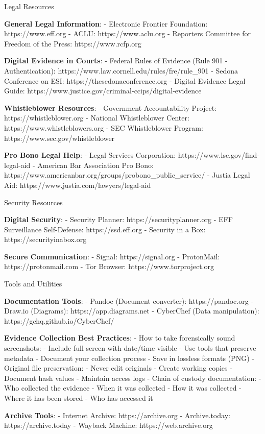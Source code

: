 Legal Resources

\textbf{General Legal Information}: - Electronic Frontier Foundation:
https://www.eff.org - ACLU: https://www.aclu.org - Reporters Committee
for Freedom of the Press: https://www.rcfp.org

\textbf{Digital Evidence in Courts}: - Federal Rules of Evidence (Rule
901 - Authentication): https://www.law.cornell.edu/rules/fre/rule\_901 -
Sedona Conference on ESI: https://thesedonaconference.org - Digital
Evidence Legal Guide:
https://www.justice.gov/criminal-ccips/digital-evidence

\textbf{Whistleblower Resources}: - Government Accountability Project:
https://whistleblower.org - National Whistleblower Center:
https://www.whistleblowers.org - SEC Whistleblower Program:
https://www.sec.gov/whistleblower

\textbf{Pro Bono Legal Help}: - Legal Services Corporation:
https://www.lsc.gov/find-legal-aid - American Bar Association Pro Bono:
https://www.americanbar.org/groups/probono\_public\_service/ - Justia
Legal Aid: https://www.justia.com/lawyers/legal-aid

Security Resources

\textbf{Digital Security}: - Security Planner:
https://securityplanner.org - EFF Surveillance Self-Defense:
https://ssd.eff.org - Security in a Box: https://securityinabox.org

\textbf{Secure Communication}: - Signal: https://signal.org -
ProtonMail: https://protonmail.com - Tor Browser:
https://www.torproject.org

Tools and Utilities

\textbf{Documentation Tools}: - Pandoc (Document converter):
https://pandoc.org - Draw.io (Diagrams): https://app.diagrams.net -
CyberChef (Data manipulation): https://gchq.github.io/CyberChef/

\textbf{Evidence Collection Best Practices}: - How to take forensically
sound screenshots: - Include full screen with date/time visible - Use
tools that preserve metadata - Document your collection process - Save
in lossless formats (PNG) - Original file preservation: - Never edit
originals - Create working copies - Document hash values - Maintain
access logs - Chain of custody documentation: - Who collected the
evidence - When it was collected - How it was collected - Where it has
been stored - Who has accessed it

\textbf{Archive Tools}: - Internet Archive: https://archive.org -
Archive.today: https://archive.today - Wayback Machine:
https://web.archive.org

